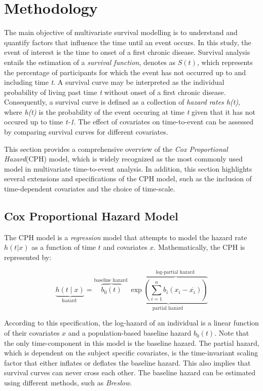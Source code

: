 \chapter{Methodology}
\label{chap:methodology}
The main objective of multivariate survival modelling is to understand and quantify factors that influence the time until an event occurs. In this study, the event of interest is the time to onset of a first chronic disease. Survival analysis entails the estimation of a \textit{survival function}, denotes as \begin{math}
    S(t)
\end{math}, which represents the percentage of participants for which the event has not occurred up to and including time \textit{t}. A survival curve may be interpreted as the individual probability of living past time \textit{t} without onset of a first chronic disease. Consequently, a survival curve is defined as a collection of \textit{hazard rates h(t)}, where \textit{h(t)} is the probability of the event occuring at time \textit{t} given that it has not occured up to time \textit{t-1}. The effect of covariates on time-to-event can be assessed by comparing survival curves for different covariates. 

This section provides a comprehensive overview of the \textit{Cox Proportional Hazard}(CPH) model, which is widely recognized as the most commonly used model in multivariate time-to-event analysis. In addition, this section highlights several extensions and specifications of the CPH model, such as the inclusion of time-dependent covariates and the choice of time-scale. 
\medskip
\section{Cox Proportional Hazard Model}
\label{section:data:CPH}
The CPH model is a \textit{regression} model that attempts to model the hazard rate $h(t|x)$ as a function of time $t$ and covariates $x$. Mathematically, the CPH is represented by: 

$$
\underbrace{h(t \mid x)}_{\text {hazard }} = \overbrace{b_0(t)}^{\text {baseline hazard }} \underbrace{\exp \overbrace{\left(\sum_{i=1}^n b_i\left(x_i-\overline{x_i}\right)\right)}^{\text {log-partial hazard }}}_{\text {partial hazard }}
$$

According to this specification, the log-hazard of an individual is a linear function of their covariates $x$ and a population-based baseline hazard $b_{0}(t)$. Note that the only time-component in this model is the baseline hazard. The partial hazard, which is dependent on the subject specific covariates, is the time-invariant scaling factor that either inflates or deflates the baseline hazard. This also implies that survival curves can never cross each other. The baseline hazard can be estimated using different methods, such as \textit{Breslow}. %

